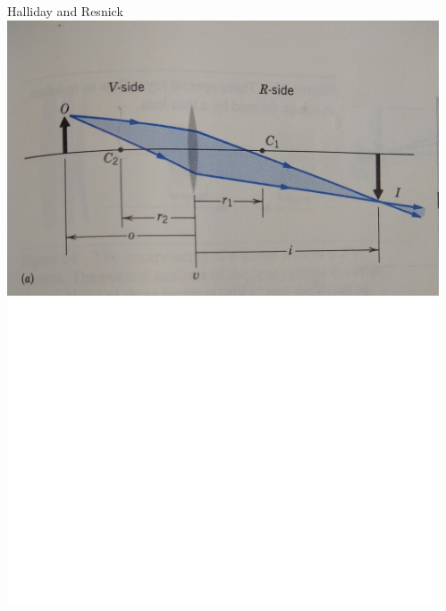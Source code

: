 \documentclass{beamer}
\begin{document}
{\begin{columns}
\begin{column}{0.5\textwidth}
\begin{itemize}
            \end{itemize}
        \end{column}
        \begin{column}{0.5\textwidth}
            \begin{center}
                {\tiny Halliday and Resnick}
                \newline
                \includegraphics[width=\textwidth]{optics-halliday-resnick-crop.jpg}
                \newline
                \includegraphics[width=\textwidth]{lens_geometry_invert.pdf}
            \end{center}

            
        \end{column}
    \end{columns}


}
\end{document}
